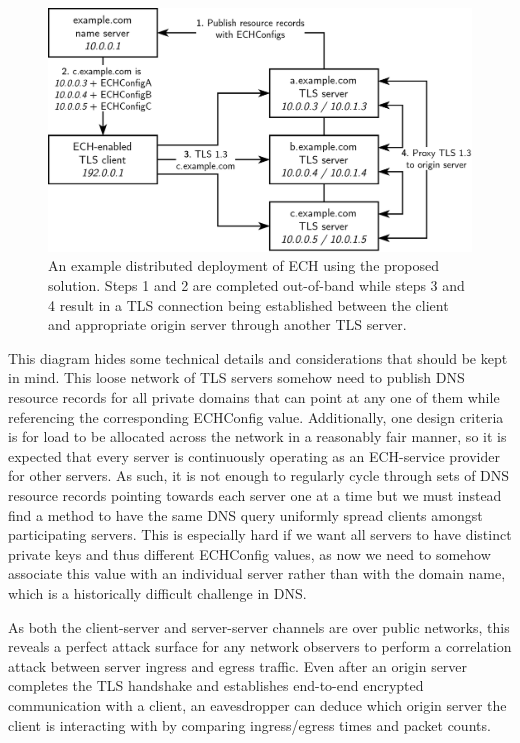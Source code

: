 \begin{figure}[ht]
\centerline{\includegraphics[width=160mm]{images/distributed-ech.png}}
\caption[Example distributed ECH deployment]{An example distributed deployment of ECH using the proposed solution. Steps 1 and 2 are completed out-of-band while steps 3 and 4 result in a TLS connection being established between the client and appropriate origin server through another TLS server.}
\label{distributed_ech_figure}
\end{figure}

This diagram hides some technical details and considerations that should be kept in mind. This loose network of TLS servers somehow need to publish DNS resource records for all private domains that can point at any one of them while referencing the corresponding ECHConfig value. Additionally, one design criteria is for load to be allocated across the network in a reasonably fair manner, so it is expected that every server is continuously operating as an ECH-service provider for other servers. As such, it is not enough to regularly cycle through sets of DNS resource records pointing towards each server one at a time but we must instead find a method to have the same DNS query uniformly spread clients amongst participating servers. This is especially hard if we want all servers to have distinct private keys and thus different ECHConfig values, as now we need to somehow associate this value with an individual server rather than with the domain name, which is a historically difficult challenge in DNS.

As both the client-server and server-server channels are over public networks, this reveals a perfect attack surface for any network observers to perform a correlation attack between server ingress and egress traffic. Even after an origin server completes the TLS handshake and establishes end-to-end encrypted communication with a client, an eavesdropper can deduce which origin server the client is interacting with by comparing ingress/egress times and packet counts.

